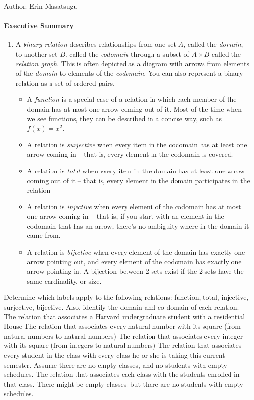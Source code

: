 \documentclass[solution, letterpaper]{cs20inclass}
\begin{document}

\noindent Author: Erin Masatsugu

\paragraph*{Executive Summary}
\begin{enumerate}
\item A {\em binary relation} describes relationships from one set $A$, called the {\em domain}, to another set $B$, called the {\em codomain} through a subset of $A \times B$ called the {\em relation graph}.  This is often depicted as a diagram with arrows from elements of the {\em domain} to elements of the {\em codomain}. You can also represent a binary relation as a set of ordered pairs.
\begin{itemize}
\item A {\em function} is a special case of a relation in which each member of the domain has at most one arrow coming out of it.  Most of the time when we see functions, they can be described in a concise way, such as $f(x) = x^2$.
\item A relation is {\em surjective} when every item in the codomain has at least one arrow coming in -- that is, every element in the codomain is covered.
\item A relation is {\em total} when every item in the domain has at least one arrow coming out of it -- that is, every element in the domain participates in the relation.
\item A relation is {\em injective} when every element of the codomain has at most one arrow coming in -- that is, if you start with an element in the codomain that has an arrow, there's no ambiguity where in the domain it came from.
\item A relation is {\em bijective} when every element of the domain has exactly one arrow pointing out, and every element of the codomain has exactly one arrow pointing in. A bijection between 2 sets exist if the 2 sets have the same cardinality, or size.
\end{itemize}
\end{enumerate}

\pagebreak

\problem Determine which labels apply to the following relations: function, total, injective, surjective, bijective. Also, identify the domain and co-domain of each relation.
\subproblem The relation that associates a Harvard undergraduate student with a residential House
\subproblem The relation that associates every natural number with its square (from natural numbers to natural numbers)
\subproblem The relation that associates every integer with its square (from integers to natural numbers)
\subproblem The relation that associates every student in the class with every class he or she is taking this current semester. Assume there are no empty classes, and no students with empty schedules.
\subproblem The relation that associates each class with the students enrolled in that class. There might be empty classes, but there are no students with empty schedules.
\end{document}
